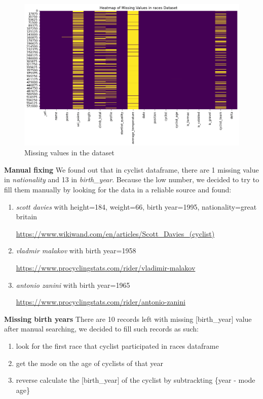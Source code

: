 \documentclass{article}
\begin{document}
\begin{figure}[H]
    \centering
    \includegraphics[width=1\linewidth]{missing.png}
    \caption{Missing values in the dataset}
    \label{missing}
\end{figure}


\textbf{Manual fixing}
We found out that in cyclist dataframe, there are 1 missing value in \emph{nationality} and 13 in \emph{birth\_year}. Because the low number, we decided to try to fill them manually by looking for the data in a reliable source and found: 

\begin{enumerate}
    \item \emph{scott davies} with height=184, weight=66, birth year=1995, nationality=great britain 
    
    \url{https://www.wikiwand.com/en/articles/Scott_Davies_(cyclist)
}
    \item  \emph{vladmir malakov} with birth year=1958 
    
    \url{https://www.procyclingstats.com/rider/vladimir-malakov
}
    \item \emph{antonio zanini} with birth year=1965 
    
    \url{https://www.procyclingstats.com/rider/antonio-zanini}
\end{enumerate}


\textbf{Missing birth years}
There are 10 records left with missing [birth\_year] value after manual searching, we decided to fill such records as such:

\begin{enumerate}
    \item look for the first race that cyclist participated in races dataframe
    \item get the mode on the age of cyclists of that year
    \item reverse calculate the [birth\_year] of the cyclist by subtrackting \{year - mode age\}
\end{enumerate}
\end{document}
